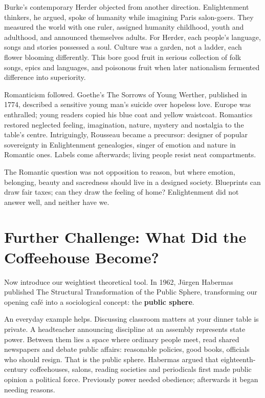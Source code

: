 Burke's contemporary Herder objected from another direction. Enlightenment thinkers, he argued, spoke of humanity while imagining Paris salon-goers. They measured the world with one ruler, assigned humanity childhood, youth and adulthood, and announced themselves adults. For Herder, each people's language, songs and stories possessed a soul. Culture was a garden, not a ladder, each flower blooming differently. This bore good fruit in serious collection of folk songs, epics and languages, and poisonous fruit when later nationalism fermented difference into superiority.

Romanticism followed. Goethe's The Sorrows of Young Werther, published in 1774, described a sensitive young man's suicide over hopeless love. Europe was enthralled; young readers copied his blue coat and yellow waistcoat. Romantics restored neglected feeling, imagination, nature, mystery and nostalgia to the table's centre. Intriguingly, Rousseau became a precursor: designer of popular sovereignty in Enlightenment genealogies, singer of emotion and nature in Romantic ones. Labels come afterwards; living people resist neat compartments.

The Romantic question was not opposition to reason, but where emotion, belonging, beauty and sacredness should live in a designed society. Blueprints can draw fair taxes; can they draw the feeling of home? Enlightenment did not answer well, and neither have we.

\section[Further Challenge: The Public Sphere]{Further Challenge: What Did the Coffeehouse Become?}
Now introduce our weightiest theoretical tool. In 1962, Jürgen Habermas published The Structural Transformation of the Public Sphere, transforming our opening café into a sociological concept: the \textbf{public sphere}.

An everyday example helps. Discussing classroom matters at your dinner table is private. A headteacher announcing discipline at an assembly represents state power. Between them lies a space where ordinary people meet, read shared newspapers and debate public affairs: reasonable policies, good books, officials who should resign. That is the public sphere. Habermas argued that eighteenth-century coffeehouses, salons, reading societies and periodicals first made public opinion a political force. Previously power needed obedience; afterwards it began needing reasons.

